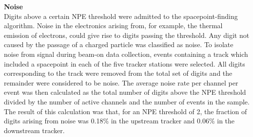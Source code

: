 \noindent\textbf{Noise}\\
\noindent
Digits above a certain NPE threshold were admitted to the
spacepoint-finding algorithm.
Noise in the electronics arising from, for example, the thermal
emission of electrons, could give rise to digits passing the threshold.
Any digit not caused by the passage of a charged particle was
classified as noise.
To isolate noise from signal during beam-on data collection, events
containing a track which included a spacepoint in each of the five
tracker stations were selected.
All digits corresponding to the track were removed from the total set
of digits and the remainder were considered to be noise.
The average noise rate per channel per event was then calculated as
the total number of digits above the NPE threshold divided by the
number of active channels and the  number of events in the sample.
The result of this calculation was that, for an NPE threshold of 2,
the fraction of digits arising from noise was 0.18\% in the upstream
tracker and 0.06\% in the downstream tracker. \\

